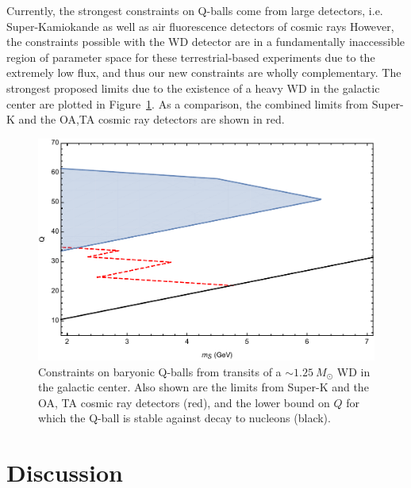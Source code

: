 \documentclass[twocolumn,showpacs,preprintnumbers,amsmath,amssymb,prd]{revtex4}
\begin{document}
Currently, the strongest constraints on Q-balls come from large detectors, i.e. Super-Kamiokande as well as air fluorescence detectors of cosmic rays
However, the constraints possible with the WD detector are in a fundamentally inaccessible region of parameter space for these terrestrial-based experiments due to the extremely low flux, and thus our new constraints are wholly complementary.
The strongest proposed limits due to the existence of a heavy WD in the galactic center are plotted in Figure~\ref{fig:Qballconstraint}. As a comparison, the combined limits from Super-K and the OA,TA cosmic ray detectors are shown in red. 

\begin{figure}
\includegraphics[scale=.45]{Qballconstraint.pdf}
\caption{Constraints on baryonic Q-balls from transits of a $\sim 1.25 ~M_{\odot}$ WD in the galactic center. Also shown are the limits from Super-K and the OA, TA cosmic ray detectors (red), and the lower bound on $Q$ for which the Q-ball is stable against decay to nucleons (black).}
\label{fig:Qballconstraint}
\end{figure}

\section{Discussion}
\label{sec:discussion}
\end{document}
